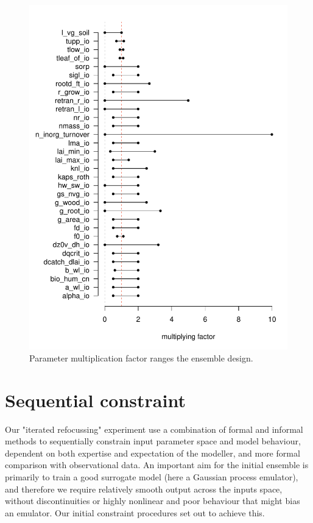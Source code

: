 \documentclass[gmd, manuscript]{copernicus}
\begin{document}
\begin{figure}[t]
\includegraphics[width=12cm]{./graphics/lhs_range.pdf}
\caption{Parameter multiplication factor ranges the ensemble design.}
\label{fig:lhs_range}
\end{figure}

\section{Sequential constraint}\label{sec:sequential_constraint}

Our "iterated refocussing" experiment use a combination of formal and informal methods to sequentially constrain input parameter space and model behaviour, dependent on both expertise and expectation of the modeller, and more formal comparison with observational data. An important aim for the initial ensemble is primarily to train a good surrogate model (here a Gaussian process emulator), and therefore we require relatively smooth output across the inputs space, without discontinuities or highly nonlinear and poor behaviour that might bias an emulator. Our initial constraint procedures set out to achieve this.
\end{document}
